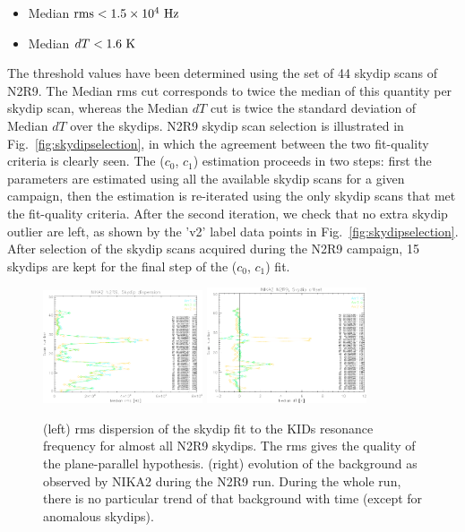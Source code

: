 \begin{itemize}
\item Median $\rm{rms} < 1.5 \times 10^{4}~\rm{Hz}$
\item Median $dT < 1.6~\rm{K}$
\end{itemize}

The threshold values have been determined using the set of 44 skydip
scans of N2R9. The Median rms cut corresponds to twice the median of
this quantity per skydip scan, whereas the Median $dT$ cut is twice
the standard deviation of Median $dT$ over the skydips.
N2R9 skydip scan selection is illustrated in
Fig.~\ref{fig:skydipselection}, in
which the agreement between the two fit-quality criteria is clearly
seen. The ($c_0$, $c_1$) estimation proceeds in two steps: first the
parameters are estimated using all the available skydip scans for a
given campaign, then the estimation is re-iterated using the only
skydip scans that met the fit-quality criteria. After the second
iteration, we check that no extra skydip outlier are left, as shown by
the 'v2' label data points in Fig.~\ref{fig:skydipselection}. After
selection of the skydip scans acquired during the N2R9 campaign, 15
skydips are kept for the final step of the ($c_0$, $c_1$) fit. 

\begin{figure}[ht!]
  \begin{center} \includegraphics[clip=true, trim={0, -0.3cm, -0.3cm,
    0},
    width=0.42\textwidth]{Figures/Opacity/test_allskd4_N2R9v3_3-crop.pdf} \includegraphics[clip=true,
    trim={0, -0.3cm, -0.3cm, 0},
    width=0.42\textwidth]{Figures/Opacity/test_allskd4_N2R9v3_4-crop.pdf} \caption[]{(left)
    rms dispersion of the skydip fit to the KIDs resonance frequency
    for almost all N2R9 skydips. The rms gives the quality of the
    plane-parallel hypothesis. (right) evolution of the background as
    observed by NIKA2 during the N2R9 run. During the whole run, there
    is no particular trend of that background with time (except for
    anomalous skydips).  }
\label{fig:skydip-stability}
\end{center}
\end{figure}

